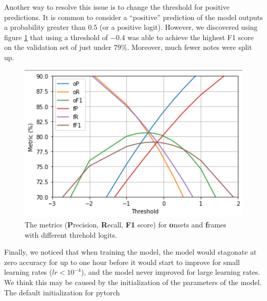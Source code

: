 \documentclass[a4paper,twocolumn,10pt]{article}
\begin{document}
Another way to resolve this issue is to change the threshold for positive predictions. It is common to consider a ``positive'' prediction of the model outputs a probability greater than \(0.5\) (or a positive logit). However, we discovered using figure \ref{fig:threshold} that using a threshold of \(-0.4\) was able to achieve the highest F1 score on the validation set of just under $79\%$. Moreover, much fewer notes were split up.

\begin{figure}[H]
  \centering
  \includegraphics[width=\linewidth]{figures/threshold.png}
  \caption{The metrics (\textbf{P}recision, \textbf{R}ecall, \textbf{F1} score) for \textbf{o}nsets and \textbf{f}rames with different threhold logits.}
  \label{fig:threshold}
\end{figure}

Finally, we noticed that when training the model, the model would stagonate at zero accuracy for up to one hour before it would start to improve for small learning rates (\(lr<10^{-4}\)), and the model never improved for large learning rates. We think this may be caused by the initialization of the parameters of the model. The default initialization for pytorch  
\end{document}
